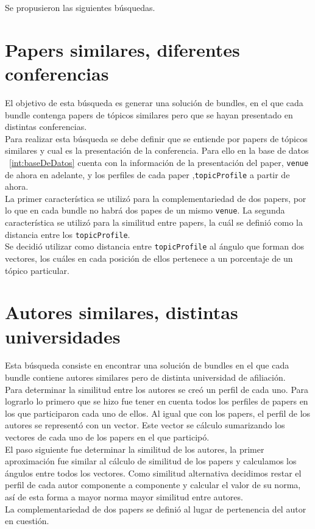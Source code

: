 Se propusieron las siguientes búsquedas.
\section{Papers similares, diferentes conferencias}\label{bus:papSimDisLug}
El objetivo de esta búsqueda es generar una solución de bundles, en el que cada bundle contenga 
papers de tópicos similares pero que se hayan presentado en distintas conferencias.\\
Para realizar esta búsqueda se debe definir que se entiende por papers de tópicos similares y cual 
es la presentación de la conferencia. Para ello en la base de datos ~\ref{int:baseDeDatos} cuenta 
con la información de la presentación del paper, \texttt{venue} de ahora en adelante, y los 
perfiles de cada paper ,\texttt{topicProfile} a partir de ahora.\\
La primer característica se utilizó para la complementariedad de dos papers, por lo que en cada 
bundle no habrá dos papes de un mismo \texttt{venue}. La segunda característica se utilizó para 
la similitud entre papers, la cuál se definió como la distancia entre los \texttt{topicProfile}.\\
Se decidió utilizar como distancia entre \texttt{topicProfile} al ángulo que forman dos 
vectores, los cuáles en cada posición de ellos pertenece a un porcentaje de un tópico particular.
\section{Autores similares, distintas universidades}
Esta búsqueda consiste en encontrar una solución de bundles en el que cada bundle contiene autores 
similares pero de distinta universidad de afiliación.\\
Para determinar la similitud entre los autores se creó un perfil de cada uno. Para lograrlo lo 
primero que se hizo fue tener en cuenta todos los perfiles de papers en los que participaron cada 
uno de ellos. Al igual que con los papers, el perfil de los autores se representó con un vector. 
Este vector se cálculo sumarizando los vectores de cada uno de los papers en el que participó.\\
El paso siguiente fue determinar la similitud de los autores, la primer aproximación fue similar al 
cálculo de similitud de los papers y calculamos los ángulos entre todos los vectores. Como similitud
alternativa decidimos restar el perfil de cada autor componente a componente y calcular el valor de 
su norma, así de esta forma a mayor norma mayor similitud entre autores.\\
La complementariedad de dos papers se definió al lugar de pertenencia del autor en cuestión.
